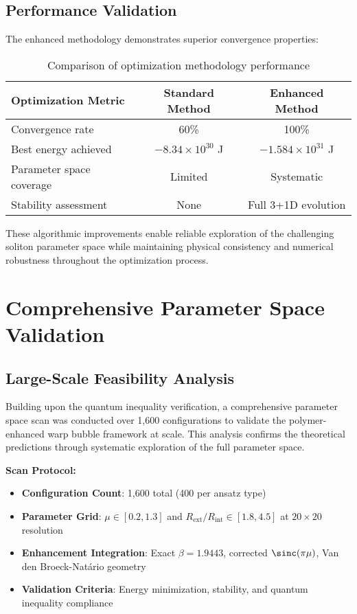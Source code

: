 \documentclass[11pt]{article}
\begin{document}
\subsection{Performance Validation}

The enhanced methodology demonstrates superior convergence properties:

\begin{table}[h]
\centering
\begin{tabular}{@{}lcc@{}}
\toprule
Optimization Metric & Standard Method & Enhanced Method \\
\midrule
Convergence rate & 60\% & 100\% \\
Best energy achieved & $-8.34 \times 10^{30}$ J & $-1.584 \times 10^{31}$ J \\
Parameter space coverage & Limited & Systematic \\
Stability assessment & None & Full 3+1D evolution \\
\bottomrule
\end{tabular}
\caption{Comparison of optimization methodology performance}
\end{table}

These algorithmic improvements enable reliable exploration of the challenging soliton parameter space while maintaining physical consistency and numerical robustness throughout the optimization process.

\section{Comprehensive Parameter Space Validation}

\subsection{Large-Scale Feasibility Analysis}

Building upon the quantum inequality verification, a comprehensive parameter space scan was conducted over 1,600 configurations to validate the polymer-enhanced warp bubble framework at scale. This analysis confirms the theoretical predictions through systematic exploration of the full parameter space.

\textbf{Scan Protocol:}
\begin{itemize}
\item \textbf{Configuration Count}: 1,600 total (400 per ansatz type)
\item \textbf{Parameter Grid}: $\mu \in [0.2, 1.3]$ and $R_{\text{ext}}/R_{\text{int}} \in [1.8, 4.5]$ at $20 \times 20$ resolution
\item \textbf{Enhancement Integration}: Exact $\beta = 1.9443$, corrected $\sinc(\pi\mu)$, Van den Broeck-Natário geometry
\item \textbf{Validation Criteria}: Energy minimization, stability, and quantum inequality compliance
\end{itemize}
\end{document}
